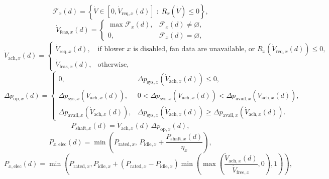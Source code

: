 \documentclass[11pt]{article}
\begin{document}
\begin{equation}
\mathcal{F}_x(d)=
\left\{
\dot V\in[0,\dot V_{\mathrm{req},x}(d)]
\;:\;
R_x(\dot V)\le 0
\right\},
\tag{18.5C-1c0}
\end{equation}
\begin{equation}
\dot V_{\mathrm{feas},x}(d)=
\begin{cases}
\max \mathcal{F}_x(d), & \mathcal{F}_x(d)\neq\varnothing,\\[4pt]
0, & \mathcal{F}_x(d)=\varnothing,
\end{cases}
\tag{18.5C-1c1}
\end{equation}
\begin{equation}
\dot V_{\mathrm{ach},x}(d)=
\begin{cases}
\dot V_{\mathrm{req},x}(d), & \text{if blower \(x\) is disabled, fan data are unavailable, or }R_x(\dot V_{\mathrm{req},x}(d))\le 0,\\[4pt]
\dot V_{\mathrm{feas},x}(d), & \text{otherwise},
\end{cases}
\tag{18.5C-1c}
\end{equation}
\begin{equation}
\Delta p_{\mathrm{op},x}(d)=
\begin{cases}
0, & \Delta p_{\mathrm{sys},x}(\dot V_{\mathrm{ach},x}(d))\le 0,\\[4pt]
\Delta p_{\mathrm{sys},x}(\dot V_{\mathrm{ach},x}(d)), &
0<\Delta p_{\mathrm{sys},x}(\dot V_{\mathrm{ach},x}(d))
<\Delta p_{\mathrm{avail},x}(\dot V_{\mathrm{ach},x}(d)),\\[4pt]
\Delta p_{\mathrm{avail},x}(\dot V_{\mathrm{ach},x}(d)), &
\Delta p_{\mathrm{sys},x}(\dot V_{\mathrm{ach},x}(d))
\ge\Delta p_{\mathrm{avail},x}(\dot V_{\mathrm{ach},x}(d)).
\end{cases}
\tag{18.5C-1d}
\end{equation}
\begin{equation}
P_{\mathrm{shaft},x}(d)=\dot V_{\mathrm{ach},x}(d)\,\Delta p_{\mathrm{op},x}(d),
\tag{18.5C-1e}
\end{equation}
\begin{equation}
P_{x,\mathrm{elec}}(d)=\min\!\left(P_{\mathrm{rated},x},\,P_{\mathrm{idle},x}+\frac{P_{\mathrm{shaft},x}(d)}{\eta_x}\right),
\tag{18.5C-1f}
\end{equation}
\begin{equation}
P_{x,\mathrm{elec}}(d)=\min\!\left(
P_{\mathrm{rated},x},
P_{\mathrm{idle},x}
\!+\!
\left(P_{\mathrm{rated},x}-P_{\mathrm{idle},x}\right)
\min\!\left(\max\!\left(\frac{\dot V_{\mathrm{ach},x}(d)}{\dot V_{\mathrm{free},x}},0\right),1\right)
\right),
\tag{18.5C-1g}
\end{equation}
\end{document}
